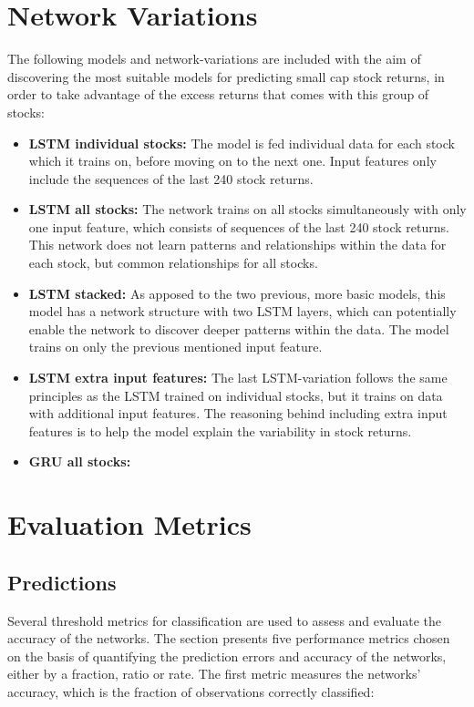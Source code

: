 \section{Network Variations}
The following models and network-variations are included with the aim of discovering the most suitable models for predicting small cap stock returns, in order to take advantage of the excess returns that comes with this group of stocks:

\indent \newline
\begin{itemize}
\item {\textbf{LSTM individual stocks:} The model is fed individual data for each stock which it trains on, before moving on to the next one. Input features only include the sequences of the last 240 stock returns.} 
\item {\textbf{LSTM all stocks:} The network trains on all stocks simultaneously with only one input feature, which consists of sequences of the last 240 stock returns. This network does not learn patterns and relationships within the data for each stock, but common relationships for all stocks.} 
\item {\textbf{LSTM stacked:} As apposed to the two previous, more basic models, this model has a network structure with two LSTM layers, which can potentially enable the network to discover deeper patterns within the data. The model trains on only the previous mentioned input feature.}
\item {\textbf{LSTM extra input features:} The last LSTM-variation follows the same principles as the LSTM trained on individual stocks, but it trains on data with additional input features. The reasoning behind including extra input features is to help the model explain the variability in stock returns.}
\item {\textbf{GRU all stocks:}}
\end{itemize}

\section{Evaluation Metrics}
\subsection{Predictions}
Several threshold metrics for classification are used to assess and evaluate the accuracy of the networks. The section presents five performance metrics chosen on the basis of quantifying the prediction errors and accuracy of the networks, either by a fraction, ratio or rate. The first metric measures the networks' accuracy, which is the fraction of observations correctly classified:

